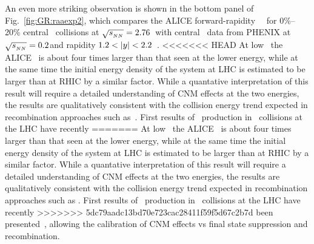 An even more striking observation is shown in the bottom panel of Fig.~\ref{fig:GR:raaexp2}, which compares
the ALICE forward-rapidity \jpsi\ \Raa\ for 0\%--20\% central \PbPb\ collisions at  $\sqrt{s_{_{NN}}} = 2.76$\TeV\
with central \AuAu\ data from PHENIX at $\sqrt{s_{_{NN}}} = 0.2$\GeV and rapidity $1.2 < |y| < 2.2$~\cite{Adare:2011yf}.
<<<<<<< HEAD
At low \pT\ the ALICE \Raa\ is about four times larger than that seen at the lower energy, while 
at the same time the initial energy density of the system at LHC is estimated to be larger than at 
RHIC by a similar factor. While a quantative interpretation of this result will require 
a detailed understanding of CNM effects at the two energies, the results are qualitatively consistent 
with the collision energy trend expected in recombination approaches such as~\cite{Zhao:2007hh,Zhou:2013aea,Liu:2009nb}.
First results of \jpsi\ production in \pPb\ collisions at the LHC have recently 
=======
At low \pT\ the ALICE \Raa\ is about four times larger than that seen at the lower energy, while
at the same time the initial energy density of the system at LHC is estimated to be larger than at
RHIC by a similar factor. While a quantative interpretation of this result will require
a detailed understanding of CNM effects at the two energies, the results are qualitatively consistent
with the collision energy trend expected in recombination approaches such as
\cite{Zhao:2007hh,Zhou:2013aea,Liu:2009nb}.
First results of \jpsi\ production in \pPb\ collisions at the LHC have recently
>>>>>>> 5dc79aadc13bd70e723cac28411f59f5d67c2b7d
been presented~\cite{Abelev:2013yxa,Aaij:2013zxa}, allowing
the calibration of CNM effects vs final state suppression and recombination.

